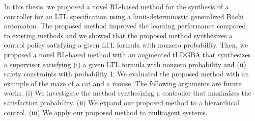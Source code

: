 In this thesis, we proposed a novel RL-based method for the synthesis of a controller for an LTL specification using a limit-deterministic generalized B\"{u}chi automaton.
The proposed method improved the learning performance compared to existing methods and we showed that the proposed method synthesizes a control policy satisfying a given LTL formula with nonzero probability.
Then, we proposed a novel RL-based method with an augmented tLDGBA that synthesizes a supervisor satisfying (i) a given LTL formula with nonzero probability and (ii) safety constraints with probability 1.  We evaluated the proposed method with an example of the maze of a cat and a mouse.
The following arguments are future works. (i) We investigate the method synthesizing a controller that maximizes the satisfaction probability. (ii) We expand our proposed method to a hierarchical control. (iii) We apply our proposed method to multiagent systems.
